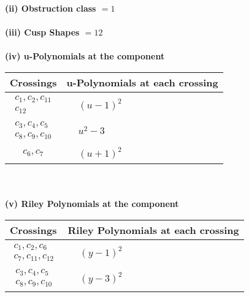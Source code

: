 \documentclass[1p]{elsarticle_modified}
\theoremstyle{definition}
\begin{document}
\flushleft \textbf{(ii) Obstruction class $= 1$}\\~\\
\flushleft \textbf{(iii) Cusp Shapes $= 12$}\\~\\
\newpage\renewcommand{\arraystretch}{1}
\flushleft \textbf{(iv) u-Polynomials at the component}\newline \\
\begin{tabular}{m{50pt}|m{274pt}}
Crossings & \hspace{64pt}u-Polynomials at each crossing \\
\hline $$\begin{aligned}c_{1},c_{2},c_{11}\\c_{12}\end{aligned}$$&$\begin{aligned}
&(u-1)^2
\end{aligned}$\\
\hline $$\begin{aligned}c_{3},c_{4},c_{5}\\c_{8},c_{9},c_{10}\end{aligned}$$&$\begin{aligned}
&u^2-3
\end{aligned}$\\
\hline $$\begin{aligned}c_{6},c_{7}\end{aligned}$$&$\begin{aligned}
&(u+1)^2
\end{aligned}$\\
\hline
\end{tabular}\\~\\
\newpage\renewcommand{\arraystretch}{1}
\flushleft \textbf{(v) Riley Polynomials at the component}\newline \\
\begin{tabular}{m{50pt}|m{274pt}}
Crossings & \hspace{64pt}Riley Polynomials at each crossing \\
\hline $$\begin{aligned}c_{1},c_{2},c_{6}\\c_{7},c_{11},c_{12}\end{aligned}$$&$\begin{aligned}
&(y-1)^2
\end{aligned}$\\
\hline $$\begin{aligned}c_{3},c_{4},c_{5}\\c_{8},c_{9},c_{10}\end{aligned}$$&$\begin{aligned}
&(y-3)^2
\end{aligned}$\\
\hline
\end{tabular}\\~\\
\end{document}
